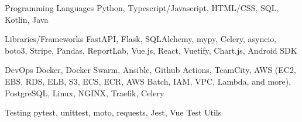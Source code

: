 
\begin{cvskills}

  \cvskill
    {Programming Languages}
    {Python, Typescript/Javascript, HTML/CSS, SQL, Kotlin, Java}

  \cvskill
    {Libraries/Frameworks}
    {FastAPI, Flask, SQLAlchemy, mypy, Celery, asyncio, boto3, Stripe, Pandas, ReportLab, Vue.js, React, Vuetify, \newline Chart.js, Android SDK}

  \cvskill
    {DevOps}
    {Docker, Docker Swarm, Ansible, Github Actions, TeamCity, AWS (EC2, EBS, RDS, ELB, S3, ECS, ECR, AWS Batch, \newline IAM, VPC, Lambda, and more), PostgreSQL, Linux, NGINX, Traefik, Celery}

  \cvskill
    {Testing}
    {pytest, unittest, moto, requests, Jest, Vue Test Utils}

\end{cvskills}